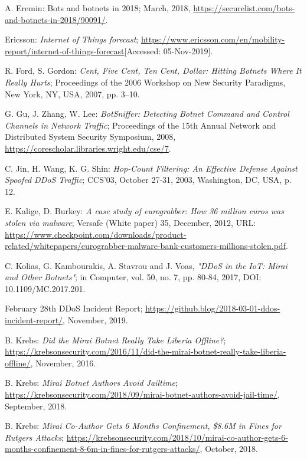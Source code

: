 \begin{thebibliography}{99}
  A. Eremin: Bots and botnets in 2018; March, 2018, \url{https://securelist.com/bots-and-botnets-in-2018/90091/}.

 Ericsson: \emph{Internet of Things forecast}; \url{https://www.ericsson.com/en/mobility-report/internet-of-things-forecast}[Accessed: 05-Nov-2019].

 R. Ford, S. Gordon: \emph{Cent, Five Cent, Ten Cent, Dollar: Hitting Botnets Where It Really Hurts}; Proceedings of the 2006 Workshop on New Security Paradigms, New York, NY, USA, 2007, pp. 3--10.

 G. Gu, J. Zhang, W. Lee: \emph{BotSniffer: Detecting Botnet Command and Control Channels in Network Traffic}; Proceedings of the 15th Annual Network and Distributed System Security Symposium, 2008, \url{https://corescholar.libraries.wright.edu/cse/7}.

 C. Jin, H. Wang, K. G. Shin: \emph{Hop-Count Filtering: An Effective Defense Against Spoofed DDoS Traffic}; CCS'03, October 27-31, 2003, Washington, DC, USA, p. 12.

 E. Kalige, D. Burkey: \emph{A case study of eurograbber: How 36 million euros was stolen via malware}; Versafe (White paper) 35, December, 2012, URL: \url{https://www.checkpoint.com/downloads/product-related/whitepapers/eurograbber-malware-bank-customers-millions-stolen.pdf}.

 C. Kolias, G. Kambourakis, A. Stavrou and J. Voas, \emph{"DDoS in the IoT: Mirai and Other Botnets"}; in Computer, vol. 50, no. 7, pp. 80-84, 2017, DOI: 10.1109/MC.2017.201.

 February 28th DDoS Incident Report; \url{https://github.blog/2018-03-01-ddos-incident-report/}, November, 2019.

 B. Krebs: \emph{Did the Mirai Botnet Really Take Liberia Offline?}; \url{https://krebsonsecurity.com/2016/11/did-the-mirai-botnet-really-take-liberia-offline/}, November, 2016.

 B. Krebs: \emph{Mirai Botnet Authors Avoid Jailtime}; \url{https://krebsonsecurity.com/2018/09/mirai-botnet-authors-avoid-jail-time/}, September, 2018.

 B. Krebs: \emph{Mirai Co-Author Gets 6 Months Confinement, \$8.6M in Fines for Rutgers Attacks}; \url{https://krebsonsecurity.com/2018/10/mirai-co-author-gets-6-months-confinement-8-6m-in-fines-for-rutgers-attacks/}, October, 2018.


\end{thebibliography}
